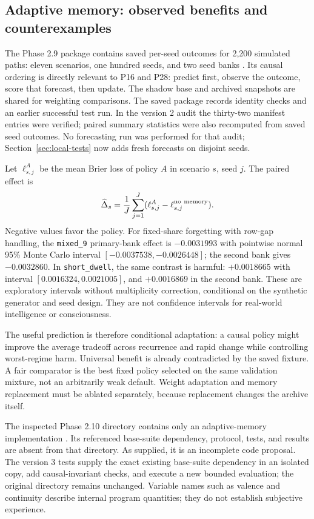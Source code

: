 \subsection{Adaptive memory: observed benefits and counterexamples}
The Phase 2.9 package contains saved per-seed outcomes for 2,200 simulated paths: eleven scenarios, one hundred seeds, and two seed banks \cite{memory29}. Its causal ordering is directly relevant to P16 and P28: predict first, observe the outcome, score that forecast, then update. The shadow base and archived snapshots are shared for weighting comparisons. The saved package records identity checks and an earlier successful test run. In the version 2 audit the thirty-two manifest entries were verified; paired summary statistics were also recomputed from saved seed outcomes. No forecasting run was performed for that audit; Section~\ref{sec:local-tests} now adds fresh forecasts on disjoint seeds.

Let $\ell_{s,j}^{A}$ be the mean Brier loss of policy $A$ in scenario $s$, seed $j$. The paired effect is
\begin{equation}
 \widehat\Delta_s=\frac{1}{J}\sum_{j=1}^{J}
 (\ell_{s,j}^{A}-\ell_{s,j}^{\rm no\ memory}).
\end{equation}
Negative values favor the policy. For fixed-share forgetting with row-gap handling, the \texttt{mixed\_9} primary-bank effect is $-0.0031993$ with pointwise normal 95\% Monte Carlo interval $[-0.0037538,-0.0026448]$; the second bank gives $-0.0032860$. In \texttt{short\_dwell}, the same contrast is harmful: $+0.0018665$ with interval $[0.0016324,0.0021005]$, and $+0.0016869$ in the second bank. These are exploratory intervals without multiplicity correction, conditional on the synthetic generator and seed design. They are not confidence intervals for real-world intelligence or consciousness.

The useful prediction is therefore conditional adaptation: a causal policy might improve the average tradeoff across recurrence and rapid change while controlling worst-regime harm. Universal benefit is already contradicted by the saved fixture. A fair comparator is the best fixed policy selected on the same validation mixture, not an arbitrarily weak default. Weight adaptation and memory replacement must be ablated separately, because replacement changes the archive itself.

The inspected Phase 2.10 directory contains only an adaptive-memory implementation \cite{memory210}. Its referenced base-suite dependency, protocol, tests, and results are absent from that directory. As supplied, it is an incomplete code proposal. The version 3 tests supply the exact existing base-suite dependency in an isolated copy, add causal-invariant checks, and execute a new bounded evaluation; the original directory remains unchanged. Variable names such as valence and continuity describe internal program quantities; they do not establish subjective experience.

